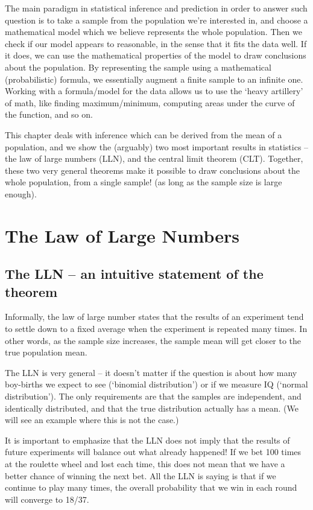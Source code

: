 The main paradigm in statistical inference and prediction in order to answer such question is to take a sample from the population we're interested in, and choose a mathematical model which we believe represents the whole population. Then we check if our model appears to reasonable, in the sense that it fits the data well. If it does, we can use the mathematical properties of the model to draw conclusions about the population. By representing the sample using a mathematical (probabilistic) formula, we essentially augment a finite sample to an infinite one. Working with a formula/model for the data allows us to use the `heavy artillery' of math, like finding maximum/minimum, computing areas under the curve of the function, and so on. 

This chapter deals with inference which can be derived from the mean of a population, and we show the (arguably) two most important results in statistics -- the law of large numbers (LLN), and the central limit theorem (CLT). Together, these two very general theorems make it possible to draw conclusions about the whole population, from a single sample! (as long as the sample size is large enough).


\section{The Law of Large Numbers}







\subsection{The LLN -- an intuitive statement of the theorem}
Informally, the law of large number states that the results of an experiment tend to settle down to a fixed average when the experiment is repeated many times. In other words, as the sample size increases, the sample mean will get closer to the true population mean.

The LLN is very general -- it doesn't matter if the question is about how many boy-births we expect to see (`binomial distribution') or if we measure IQ (`normal distribution'). The only requirements are that the samples are independent, and identically distributed, and that the true distribution actually has a mean. (We will see an example where this is not the case.)

It is important to emphasize that the LLN does not imply that the results of future experiments will balance out what already happened! If we bet 100 times at the roulette wheel and lost each time, this does not mean that we have a better chance of winning the next bet. All the LLN is saying is that if we continue to play many times, the overall probability that we win in each round will converge to 18/37.

